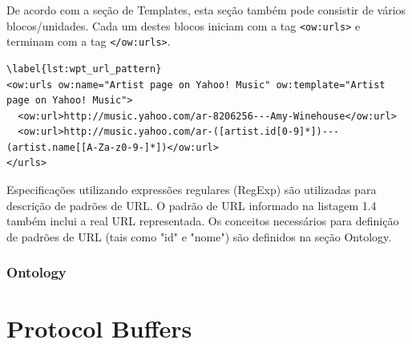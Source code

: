 De acordo com a seção de Templates, esta seção também pode consistir de vários blocos/unidades. Cada um destes blocos iniciam com a tag \texttt{<ow:urls>} e terminam com a tag \texttt{</ow:urls>}.


\begin{lstlisting}
\label{lst:wpt_url_pattern}
<ow:urls ow:name="Artist page on Yahoo! Music" ow:template="Artist page on Yahoo! Music">
  <ow:url>http://music.yahoo.com/ar-8206256---Amy-Winehouse</ow:url>
  <ow:url>http://music.yahoo.com/ar-([artist.id[0-9]*])---(artist.name[[A-Za-z0-9-]*])</ow:url>
</urls>
\end{lstlisting}

Especificações utilizando expressões regulares (RegExp) são utilizadas para descrição de padrões de URL. O padrão de URL informado na listagem 1.4 também inclui a real URL representada. Os conceitos necessários para definição de padrões de URL (tais como "id" e "nome") são definidos na seção Ontology.

\subsubsection{Ontology}

\pagebreak
\section{Protocol Buffers}
